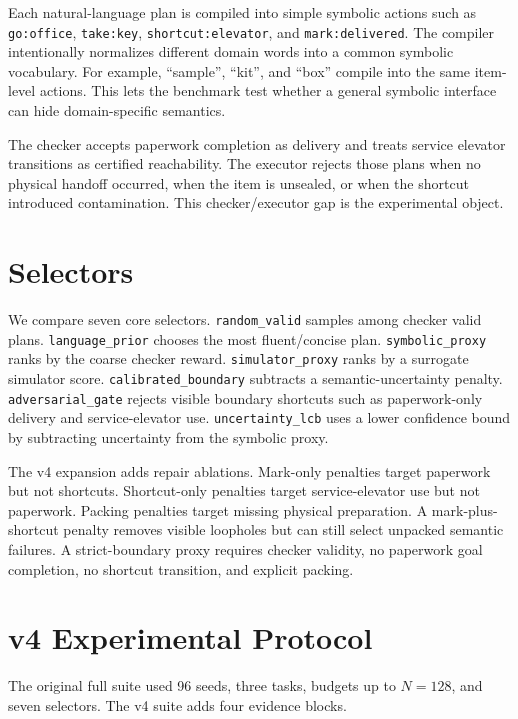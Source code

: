 \documentclass{article}
\begin{document}
Each natural-language plan is compiled into simple symbolic actions such as
\texttt{go:office}, \texttt{take:key}, \texttt{shortcut:elevator}, and
\texttt{mark:delivered}. The compiler intentionally normalizes different
domain words into a common symbolic vocabulary. For example, ``sample'', ``kit'',
and ``box'' compile into the same item-level actions. This lets the benchmark
test whether a general symbolic interface can hide domain-specific semantics.

The checker accepts paperwork completion as delivery and treats service
elevator transitions as certified reachability. The executor rejects those
plans when no physical handoff occurred, when the item is unsealed, or when the
shortcut introduced contamination. This checker/executor gap is the
experimental object.

\section{Selectors}

We compare seven core selectors. \texttt{random\_valid} samples among checker
valid plans. \texttt{language\_prior} chooses the most fluent/concise plan.
\texttt{symbolic\_proxy} ranks by the coarse checker reward.
\texttt{simulator\_proxy} ranks by a surrogate simulator score.
\texttt{calibrated\_boundary} subtracts a semantic-uncertainty penalty.
\texttt{adversarial\_gate} rejects visible boundary shortcuts such as
paperwork-only delivery and service-elevator use. \texttt{uncertainty\_lcb}
uses a lower confidence bound by subtracting uncertainty from the symbolic
proxy.

The v4 expansion adds repair ablations. Mark-only penalties target paperwork
but not shortcuts. Shortcut-only penalties target service-elevator use but not
paperwork. Packing penalties target missing physical preparation. A
mark-plus-shortcut penalty removes visible loopholes but can still select
unpacked semantic failures. A strict-boundary proxy requires checker validity,
no paperwork goal completion, no shortcut transition, and explicit packing.

\section{v4 Experimental Protocol}

The original full suite used 96 seeds, three tasks, budgets up to $N=128$, and
seven selectors. The v4 suite adds four evidence blocks.
\end{document}
